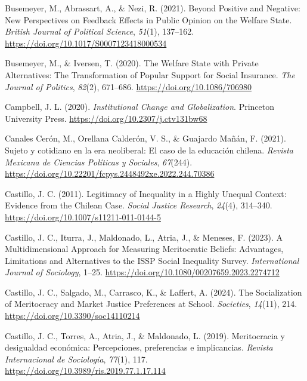 \documentclass[
  13pt,
]{article}
\newlength{\cslhangindent}
\newenvironment{CSLReferences}[2] %
 {\begin{list}{}{%
  \setlength{\itemindent}{0pt}
  \setlength{\leftmargin}{0pt}
  \setlength{\parsep}{0pt}
  \ifodd #1
   \setlength{\leftmargin}{\cslhangindent}
   \setlength{\itemindent}{-1\cslhangindent}
  \fi
  \setlength{\itemsep}{#2\baselineskip}}}
 {\end{list}}
\begin{document}
\begin{CSLReferences}{1}{0}
Busemeyer, M., Abrassart, A., \& Nezi, R. (2021). Beyond {Positive} and
{Negative}: {New Perspectives} on {Feedback Effects} in {Public Opinion}
on the {Welfare State}. \emph{British Journal of Political Science},
\emph{51}(1), 137--162. \url{https://doi.org/10.1017/S0007123418000534}

Busemeyer, M., \& Iversen, T. (2020). The {Welfare State} with {Private
Alternatives}: {The Transformation} of {Popular Support} for {Social
Insurance}. \emph{The Journal of Politics}, \emph{82}(2), 671--686.
\url{https://doi.org/10.1086/706980}

Campbell, J. L. (2020). \emph{Institutional {Change} and
{Globalization}}. Princeton University Press.
\url{https://doi.org/10.2307/j.ctv131bw68}

Canales Cerón, M., Orellana Calderón, V. S., \& Guajardo Mañán, F.
(2021). Sujeto y cotidiano en la era neoliberal: El caso de la
educaci{ó}n chilena. \emph{Revista Mexicana de Ciencias Pol{í}ticas y
Sociales}, \emph{67}(244).
\url{https://doi.org/10.22201/fcpys.2448492xe.2022.244.70386}

Castillo, J. C. (2011). Legitimacy of {Inequality} in a {Highly Unequal
Context}: {Evidence} from the {Chilean Case}. \emph{Social Justice
Research}, \emph{24}(4), 314--340.
\url{https://doi.org/10.1007/s11211-011-0144-5}

Castillo, J. C., Iturra, J., Maldonado, L., Atria, J., \& Meneses, F.
(2023). A {Multidimensional Approach} for {Measuring Meritocratic
Beliefs}: {Advantages}, {Limitations} and {Alternatives} to the {ISSP
Social Inequality Survey}. \emph{International Journal of Sociology},
1--25. \url{https://doi.org/10.1080/00207659.2023.2274712}

Castillo, J. C., Salgado, M., Carrasco, K., \& Laffert, A. (2024). The
{Socialization} of {Meritocracy} and {Market Justice Preferences} at
{School}. \emph{Societies}, \emph{14}(11), 214.
\url{https://doi.org/10.3390/soc14110214}

Castillo, J. C., Torres, A., Atria, J., \& Maldonado, L. (2019).
Meritocracia y desigualdad econ{ó}mica: {Percepciones}, preferencias e
implicancias. \emph{Revista Internacional de Sociolog{í}a},
\emph{77}(1), 117. \url{https://doi.org/10.3989/ris.2019.77.1.17.114}


\end{CSLReferences}
\end{document}

